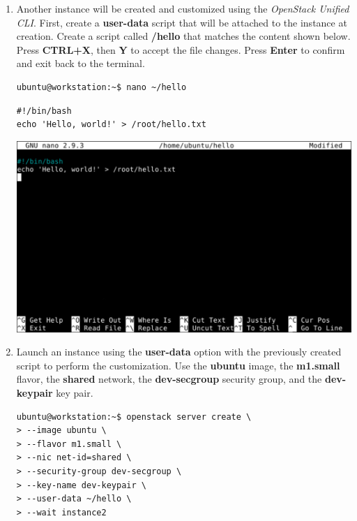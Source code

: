 \documentclass[letterpaper, 12pt]{article}
\begin{document}
\begin{enumerate}
    \item Another instance will be created and customized using the \textit{OpenStack Unified CLI}. First, create a
    \textbf{user-data} script that will be attached to the instance at creation. Create a script called
    \textbf{\texttildemid/hello} that matches the content shown below. Press \textbf{CTRL+X}, then \textbf{Y} to
    accept the file changes. Press \textbf{Enter} to confirm and exit back to the terminal.
\begin{lstlisting}
ubuntu@workstation:~$ nano ~/hello
\end{lstlisting}
\begin{lstlisting}
#!/bin/bash
echo 'Hello, world!' > /root/hello.txt
\end{lstlisting}

    \begin{center}
        \includegraphics[width=\linewidth]{images/part1/step34.png}
    \end{center}

    \item Launch an instance using the \textbf{user-data} option with the previously created script to perform the
    customization. Use the \textbf{ubuntu} image, the \textbf{m1.small} flavor, the \textbf{shared} network, the
    \textbf{dev-secgroup} security group, and the \textbf{dev-keypair} key pair.
\begin{lstlisting}
ubuntu@workstation:~$ openstack server create \
> --image ubuntu \
> --flavor m1.small \
> --nic net-id=shared \
> --security-group dev-secgroup \
> --key-name dev-keypair \
> --user-data ~/hello \
> --wait instance2
\end{lstlisting}


\end{enumerate}
\end{document}
